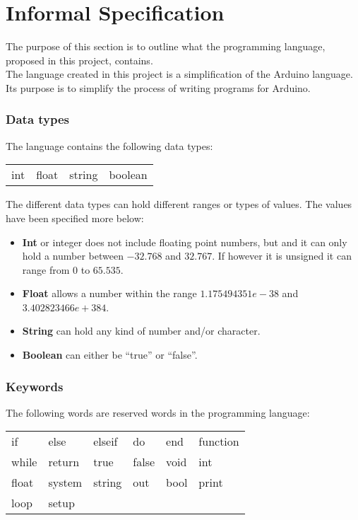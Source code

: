 \chapter{Informal Specification}\label{analysis:informal-specification}
The purpose of this section is to outline what the programming language, proposed in this project, contains.
\\The language created in this project is a simplification of the Arduino language. Its purpose is to simplify the process of writing programs for Arduino.   

\subsection{Data types}
The language contains the following data types: \\ 
\begin{center}
\begin{tabular}{ l l l l}
int & float & string & boolean \\
\end{tabular}
\end{center}

The different data types can hold different ranges or types of values. The values have been specified more below: 
\begin{itemize}
\item \textbf{Int} or integer does not include floating point numbers, but and it can only hold a number between $-32.768$ and $32.767$. If however it is unsigned it can range from $0$ to $65.535$.
\item \textbf{Float} allows a number within the range $1.175494351e-38$ and $3.402823466e+384$.
\item \textbf{String} can hold any kind of number and/or character. 
\item \textbf{Boolean} can either be ``true'' or ``false''. 
\end{itemize}

\subsection{Keywords}
The following words are reserved words in the programming language:\\ 
\begin{center}
\begin{tabular}{ l l l l l l}
if & else & elseif & do & end & function \\
while & return & true & false & void & int \\
float & system & string & out & bool & print\\
loop & setup \\
\end{tabular}
\end{center}

